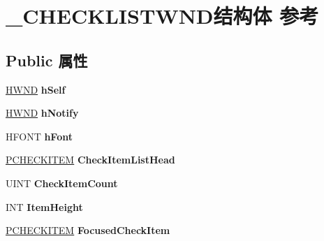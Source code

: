 \hypertarget{struct___c_h_e_c_k_l_i_s_t_w_n_d}{}\section{\+\_\+\+C\+H\+E\+C\+K\+L\+I\+S\+T\+W\+N\+D结构体 参考}
\label{struct___c_h_e_c_k_l_i_s_t_w_n_d}
\subsection*{Public 属性}
\begin{DoxyCompactItemize}
\item 
\mbox{\label{struct___c_h_e_c_k_l_i_s_t_w_n_d_adc775e890edb8bda5e013054d56429a7}} 
\hyperlink{interfacevoid}{H\+W\+ND} {\bfseries h\+Self}
\item 
\mbox{\label{struct___c_h_e_c_k_l_i_s_t_w_n_d_a81de1d809e3e84950fb2fc7de7f37add}} 
\hyperlink{interfacevoid}{H\+W\+ND} {\bfseries h\+Notify}
\item 
\mbox{\label{struct___c_h_e_c_k_l_i_s_t_w_n_d_ae46c97fafa2cf177c6b8c242bf86710f}} 
H\+F\+O\+NT {\bfseries h\+Font}
\item 
\mbox{\label{struct___c_h_e_c_k_l_i_s_t_w_n_d_a89ca58ef10b727dcdfdcd8e76a4c51c8}} 
\hyperlink{struct___c_h_e_c_k_i_t_e_m}{P\+C\+H\+E\+C\+K\+I\+T\+EM} {\bfseries Check\+Item\+List\+Head}
\item 
\mbox{\label{struct___c_h_e_c_k_l_i_s_t_w_n_d_ad7765f0df9ef28aeed1a89a2c5669169}} 
U\+I\+NT {\bfseries Check\+Item\+Count}
\item 
\mbox{\label{struct___c_h_e_c_k_l_i_s_t_w_n_d_a3f69ed4657136c8bec9b5880fb7a2fab}} 
I\+NT {\bfseries Item\+Height}
\item 
\mbox{\label{struct___c_h_e_c_k_l_i_s_t_w_n_d_a01cf57b94fcb5fbb174da53b0dfa7825}} 
\hyperlink{struct___c_h_e_c_k_i_t_e_m}{P\+C\+H\+E\+C\+K\+I\+T\+EM} {\bfseries Focused\+Check\+Item}
\item 
\mbox{\label{struct___c_h_e_c_k_l_i_s_t_w_n_d_ab3590800a8666d17f39c78e7d66fab4a}} 

\end{DoxyCompactItemize}

